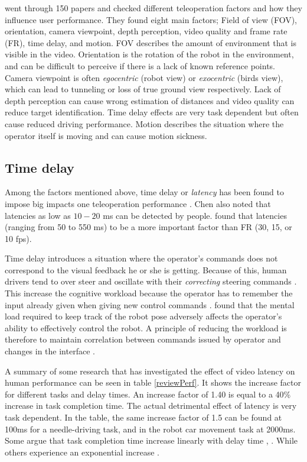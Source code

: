 \citet{Chen2007} went through 150 papers and checked different teleoperation factors and how they influence user performance. They found eight main factors; Field of view (FOV), orientation, camera viewpoint, depth perception, video quality and frame rate (FR), time delay, and motion. FOV describes the amount of environment that is visible in the video. Orientation is the rotation of the robot in the environment, and can be difficult to perceive if there is a lack of known reference points. Camera viewpoint is often \emph{egocentric} (robot view) or \emph{exocentric} (birds view), which can lead to tunneling or loss of true ground view respectively. Lack of depth perception can cause wrong estimation of distances and video quality can reduce target identification. Time delay effects are very task dependent but often cause reduced driving performance. Motion describes the situation where the operator itself is moving and can cause motion sickness.


\subsection{Time delay}\label{timeDelay}
Among the factors mentioned above, time delay or \emph{latency} has been found to impose big impacts one teleoperation performance \citep{Chen2007}. Chen also noted that latencies as low as $10-20$ ms can be detected by people. \citet{Arthur1993} found that latencies (ranging from 50 to 550 ms) to be a more important factor than FR (30, 15, or 10 fps). 

Time delay introduces a situation where the operator's commands does not correspond to the visual feedback he or she is getting. Because of this, human drivers tend to over steer and oscillate with their \emph{correcting} steering commands \citep{Appelqvist2007}. This increase the cognitive workload because the operator has to remember the input already given when giving new control commands \citep{Matheson2013}. \citet{Ricks2004} found that the mental load required to keep track of the robot pose adversely affects the operator's ability to effectively control the robot. A principle of reducing the workload is therefore to maintain correlation between commands issued by operator and changes in the interface \citep{Nielsen2007}. 

A summary of some research that has investigated the effect of video latency on human performance can be seen in table \ref{reviewPerf}. It shows the increase factor for different tasks and delay times. An increase factor of 1.40 is equal to a 40\% increase in task completion time. The actual detrimental effect of latency is very task dependent. In the table, the same increase factor of 1.5 can be found at 100ms for a needle-driving task, and in the robot car movement task at 2000ms. Some argue that task completion time increase linearly with delay time \citep{Ando1999}, \citep{Lane2002}. While others experience an exponential increase \citep{Xu2014}.


